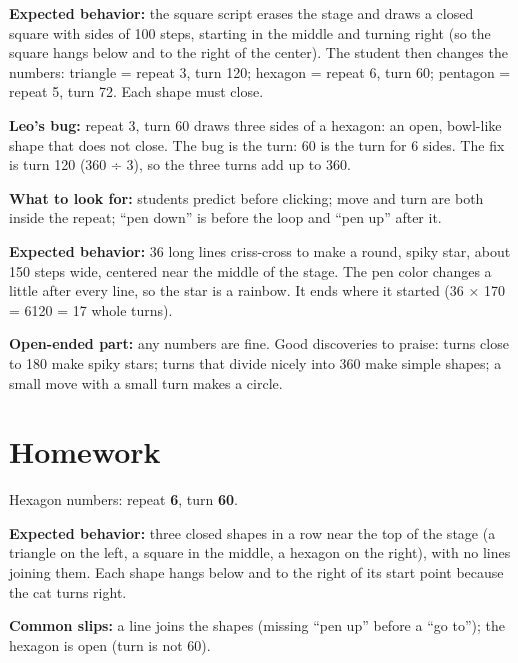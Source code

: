 \begin{answer}
\textbf{Expected behavior:} the square script erases the stage and draws a closed square with sides of 100 steps, starting in the middle and turning right (so the square hangs below and to the right of the center). The student then changes the numbers:
triangle = repeat 3, turn 120; hexagon = repeat 6, turn 60; pentagon = repeat 5, turn 72. Each shape must close.

\textbf{Leo's bug:} repeat 3, turn 60 draws three sides of a hexagon: an open, bowl-like shape that does not close. The bug is the turn: 60 is the turn for 6 sides. The fix is turn 120 (360 ÷ 3), so the three turns add up to 360.

\textbf{What to look for:} students predict before clicking; move and turn are both inside the repeat; \enquote{pen down} is before the loop and \enquote{pen up} after it.
\end{answer}

\begin{answer}
\textbf{Expected behavior:} 36 long lines criss-cross to make a round, spiky star, about 150 steps wide, centered near the middle of the stage. The pen color changes a little after every line, so the star is a rainbow. It ends where it started (36 × 170 = 6120 = 17 whole turns).

\textbf{Open-ended part:} any numbers are fine. Good discoveries to praise: turns close to 180 make spiky stars; turns that divide nicely into 360 make simple shapes; a small move with a small turn makes a circle.
\end{answer}

\section{Homework}
\begin{answer}
Hexagon numbers: repeat \textbf{6}, turn \textbf{60}.

\textbf{Expected behavior:} three closed shapes in a row near the top of the stage (a triangle on the left, a square in the middle, a hexagon on the right), with no lines joining them. Each shape hangs below and to the right of its start point because the cat turns right.

\textbf{Common slips:} a line joins the shapes (missing \enquote{pen up} before a \enquote{go to}); the hexagon is open (turn is not 60).
\end{answer}

